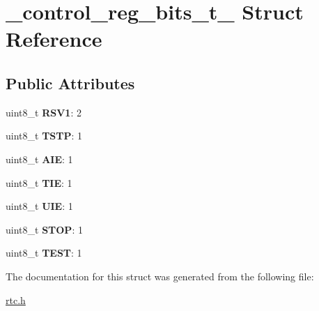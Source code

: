 \hypertarget{struct__control__reg__bits__t__}{}\section{\+\_\+control\+\_\+reg\+\_\+bits\+\_\+t\+\_\+ Struct Reference}
\label{struct__control__reg__bits__t__}
\subsection*{Public Attributes}
\begin{DoxyCompactItemize}
\item 
\mbox{\label{struct__control__reg__bits__t___a8c8b769934ea205facd5f1e016a56fab}} 
uint8\+\_\+t {\bfseries R\+S\+V1}\+: 2
\item 
\mbox{\label{struct__control__reg__bits__t___ab9abfdc46a10c07c6195a5c84e64d68d}} 
uint8\+\_\+t {\bfseries T\+S\+TP}\+: 1
\item 
\mbox{\label{struct__control__reg__bits__t___abc7b607032b235c255a9e8e355c89ddf}} 
uint8\+\_\+t {\bfseries A\+IE}\+: 1
\item 
\mbox{\label{struct__control__reg__bits__t___af6a772e6a95113451f6d6951c4fb051d}} 
uint8\+\_\+t {\bfseries T\+IE}\+: 1
\item 
\mbox{\label{struct__control__reg__bits__t___aa3a7fb6a7d9e74fc85a2a647f09cfbe1}} 
uint8\+\_\+t {\bfseries U\+IE}\+: 1
\item 
\mbox{\label{struct__control__reg__bits__t___a2c674f71ec74ad57419d43911606d4ed}} 
uint8\+\_\+t {\bfseries S\+T\+OP}\+: 1
\item 
\mbox{\label{struct__control__reg__bits__t___ab697b9ab48765af0c9ba4c89269ab47c}} 
uint8\+\_\+t {\bfseries T\+E\+ST}\+: 1
\end{DoxyCompactItemize}


The documentation for this struct was generated from the following file\+:\begin{DoxyCompactItemize}
\item 
\hyperlink{rtc_8h}{rtc.\+h}\end{DoxyCompactItemize}
